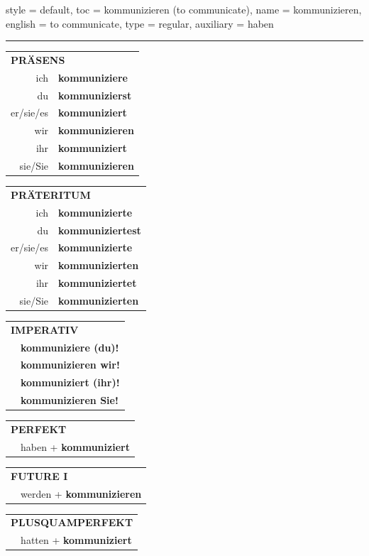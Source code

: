 \begin{verbentry}{
  style = {default},
  toc = {kommunizieren (to communicate)},
  name = {kommunizieren},
  english = {to communicate},
  type = {regular},
  auxiliary = {haben}
}
 

\vspace{5pt}
\hrule
\vspace{5pt}

\begin{tabular}{rl}
\multicolumn{2}{l}{\textbf{PRÄSENS}}\\
ich & \textbf{kommuniziere}\\
du & \textbf{kommunizierst}\\
er/sie/es & \textbf{kommuniziert}\\
wir & \textbf{kommunizieren}\\
ihr & \textbf{kommuniziert}\\
sie/Sie & \textbf{kommunizieren}\\
\end{tabular}
\hfill
\begin{tabular}{rl}
\multicolumn{2}{l}{\textbf{PRÄTERITUM}}\\
ich & \textbf{kommunizierte}\\
du & \textbf{kommuniziertest}\\
er/sie/es & \textbf{kommunizierte}\\
wir & \textbf{kommunizierten}\\
ihr & \textbf{kommuniziertet}\\
sie/Sie & \textbf{kommunizierten}\\
\end{tabular}
\hfill
\begin{tabular}{rl}
\multicolumn{2}{l}{\textbf{IMPERATIV}}\\
& \textbf{kommuniziere (du)!}\\
& \textbf{kommunizieren wir!}\\
& \textbf{kommuniziert (ihr)!}\\
& \textbf{kommunizieren Sie!}\\
\end{tabular}

\vspace{10pt}

\begin{tabular}{rl}
\multicolumn{2}{l}{\textbf{PERFEKT}}\\
& haben + \textbf{kommuniziert}\\
\end{tabular}
\hfill
\begin{tabular}{rl}
\multicolumn{2}{l}{\textbf{FUTURE I}}\\
& werden + \textbf{kommunizieren}\\
\end{tabular}
\hfill
\begin{tabular}{rl}
\multicolumn{2}{l}{\textbf{PLUSQUAMPERFEKT}}\\
& hatten + \textbf{kommuniziert}\\
\end{tabular}


\end{verbentry}
